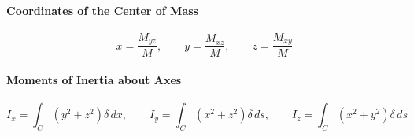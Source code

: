 \paragraph{Coordinates of the Center of Mass}
\[\bar x = \frac{M_{yz}}{M}, \qquad \bar y = \frac{M_{xz}}{M}, \qquad \bar z = \frac{M_{xy}}{M}\]
\paragraph{Moments of Inertia about Axes}
\[I_x = \int_C (y^2+z^2)\delta \, dx, \qquad I_y = \int_C (x^2+z^2) \delta \, ds, \qquad I_z = \int_C (x^2+y^2)\delta \, ds\]